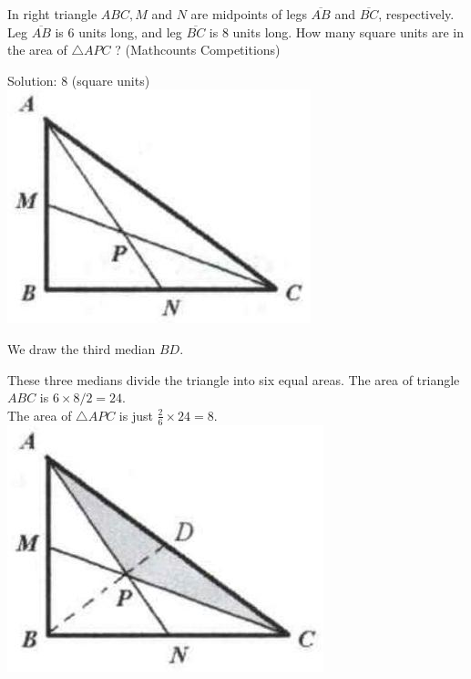 \documentclass{article}
\begin{document}
In right triangle \(A B C, M\) and \(N\) are midpoints of legs \(\overline{A B}\) and \(\overline{B C}\), respectively. Leg \(\overline{A B}\) is 6 units long, and leg \(\overline{B C}\) is 8 units long. How many square units are in the area of \(\triangle A P C\) ? (Mathcounts Competitions)

Solution: 8 (square units)\\
\centering
\includegraphics[width=\textwidth]{images/009(1).jpg}

We draw the third median \(B D\).

These three medians divide the triangle into six equal areas. The area of triangle \(A B C\) is \(6 \times 8 / 2=24\).\\
The area of \(\triangle A P C\) is just \(\frac{2}{6} \times 24=8\).\\
\centering
\includegraphics[width=\textwidth]{images/009.jpg}
\end{document}
